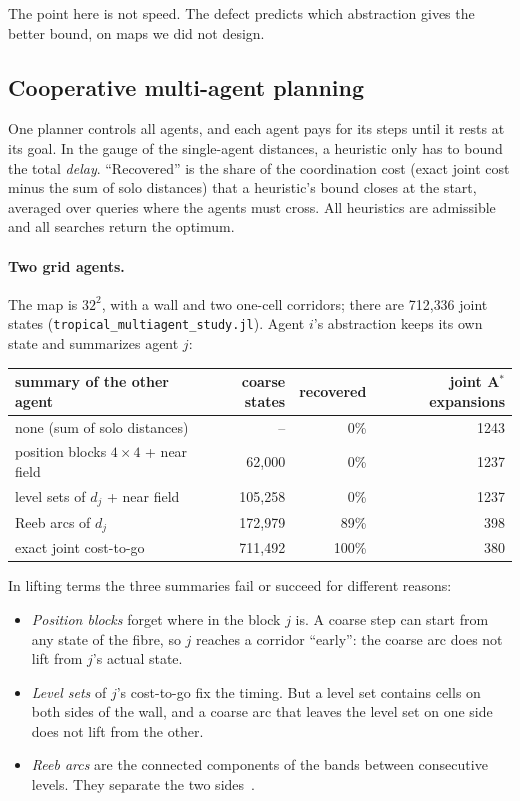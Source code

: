 \documentclass[11pt]{article}
\theoremstyle{definition}
\theoremstyle{remark}
\newcommand{\dd}{d}
\begin{document}
The point here is not speed. The defect predicts which abstraction gives the better
bound, on maps we did not design.

\subsection{Cooperative multi-agent planning}
One planner controls all agents, and each agent pays for its steps until it rests
at its goal. In the gauge of the single-agent distances, a heuristic only has to
bound the total \emph{delay}. ``Recovered'' is the share of the coordination cost
(exact joint cost minus the sum of solo distances) that a heuristic's bound closes
at the start, averaged over queries where the agents must cross. All heuristics are
admissible and all searches return the optimum.

\paragraph{Two grid agents.}
The map is $32^2$, with a wall and two one-cell corridors; there are 712{,}336
joint states (\texttt{tropical\_multiagent\_study.jl}). Agent $i$'s abstraction
keeps its own state and summarizes agent $j$:

\begin{center}
\begin{tabular}{lrrr}
\toprule
summary of the other agent & coarse states & recovered & joint A$^*$ expansions \\
\midrule
none (sum of solo distances) & -- & 0\% & 1243 \\
position blocks $4\times 4$ + near field & 62{,}000 & 0\% & 1237 \\
level sets of $\dd_j$ + near field & 105{,}258 & 0\% & 1237 \\
Reeb arcs of $\dd_j$ & 172{,}979 & 89\% & 398 \\
exact joint cost-to-go & 711{,}492 & 100\% & 380 \\
\bottomrule
\end{tabular}
\end{center}

In lifting terms the three summaries fail or succeed for different reasons:
\begin{itemize}[nosep]
\item \emph{Position blocks} forget where in the block $j$ is. A coarse step can
  start from any state of the fibre, so $j$ reaches a corridor ``early'': the
  coarse arc does not lift from $j$'s actual state.
\item \emph{Level sets} of $j$'s cost-to-go fix the timing. But a level set
  contains cells on both sides of the wall, and a coarse arc that leaves the level
  set on one side does not lift from the other.
\item \emph{Reeb arcs} are the connected components of the bands between
  consecutive levels. They separate the two sides~\cite{reeb1946,desilva2016}.
\end{itemize}
\end{document}
